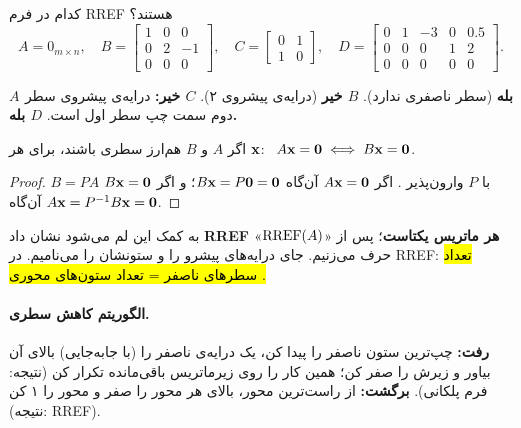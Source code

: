 \begin{example}
کدام در فرم RREF هستند؟
\[
A=0_{m\times n},\quad
B=\begin{bmatrix}1&0&0\\0&2&-1\\0&0&0\end{bmatrix},\quad
C=\begin{bmatrix}0&1\\1&0\end{bmatrix},\quad
D=\begin{bmatrix}0&1&-3&0&0.5\\0&0&0&1&2\\0&0&0&0&0\end{bmatrix}.
\]
\end{example}
\begin{solution}
\textbf{$A$ بله} (سطر ناصفری ندارد). \textbf{$B$ خیر} (درایه‌ی پیشروی ۲). \textbf{$C$ خیر:} درایه‌ی پیشروی سطر دوم سمت چپ سطر اول است. \textbf{$D$ بله.}
\end{solution}

\begin{lemma}\label{lem:col-relations}
اگر $A$ و $B$ هم‌ارز سطری باشند، برای هر $\mathbf{x}$: \ $A\mathbf{x}=\mathbf{0}\iff B\mathbf{x}=\mathbf{0}$.
\end{lemma}
\begin{proof}
$B=PA$ با $P$ وارون‌پذیر . اگر $A\mathbf{x}=\mathbf{0}$ آن‌گاه $B\mathbf{x}=P\mathbf{0}=\mathbf{0}$؛ و اگر $B\mathbf{x}=\mathbf{0}$ آن‌گاه $A\mathbf{x}=P^{-1}B\mathbf{x}=\mathbf{0}$.
\end{proof}

\begin{note}
به کمک این لم می‌شود نشان داد \textbf{RREF هر ماتریس یکتاست}؛ پس از «$\operatorname{RREF}(A)$» حرف می‌زنیم. جای درایه‌های پیشرو را  و ستونشان را  می‌نامیم. در RREF: \hl{تعداد سطرهای ناصفر = تعداد ستون‌های محوری .}
\end{note}

\paragraph{الگوریتم کاهش سطری.} \textbf{رفت:} چپ‌ترین ستون ناصفر را پیدا کن، یک درایه‌ی ناصفر را (با جابه‌جایی) بالای آن بیاور و زیرش را صفر کن؛ همین کار را روی زیرماتریس باقی‌مانده تکرار کن (نتیجه: فرم پلکانی). \textbf{برگشت:} از راست‌ترین محور، بالای هر محور را صفر و محور را ۱ کن (نتیجه: RREF).

